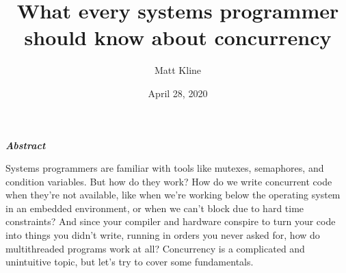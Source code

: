 \documentclass[fontsize=\bodyfontsize, numbers=endperiod]{scrartcl}
\title{What every systems programmer should know about concurrency}
\author{Matt Kline}
\date{April 28, 2020}
\makeatletter
\let\runauthor\@author
\let\rundate\@date
\let\runtitle\@title
\makeatother
\begin{document}
\begin{center}
\Large \runtitle
\bigskip

\large
\runauthor
\smallskip

\normalsize
\rundate
\end{center}
\bigskip

\ifebook
\else
\begin{adjustwidth}{1in}{1in}
\fi
\begin{center}
\large \bfseries\itshape Abstract
\end{center}
\smallskip

\noindent
Systems programmers are familiar with tools like mutexes, semaphores,
and condition variables.
But how do they work?
How do we write concurrent code when they're not available,
like when we're working below the operating system in an embedded environment,
or when we can't block due to hard time constraints?
And since your compiler and hardware conspire to turn your code into things
you didn't write, running in orders you never asked for,
how do multithreaded programs work at all?
Concurrency is a complicated and unintuitive topic,
but let's try to cover some fundamentals.
\bigskip

\tableofcontents
\ifebook
\else
\end{adjustwidth}
\fi
\medskip
\end{document}
